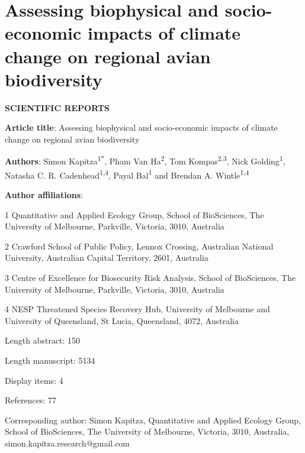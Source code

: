 \chapter{Assessing biophysical and socio-economic impacts of climate change on regional avian biodiversity}\label{ch2}
\newpage

{\parindent0pt
\textbf{SCIENTIFIC REPORTS}

\vspace{2cm}

\textbf{Article title}: Assessing biophysical and socio-economic impacts of climate change on regional avian biodiversity

\vspace{1cm}

\textbf{Authors}: Simon Kapitza\textsuperscript{1*}, Pham Van Ha\textsuperscript{2}, Tom Kompas\textsuperscript{2,3}, Nick Golding\textsuperscript{1}, Natasha C. R. Cadenhead\textsuperscript{1,4}, Payal Bal\textsuperscript{1} and Brendan A. Wintle\textsuperscript{1,4}

\vspace{1cm}

\textbf{Author affiliations}:

1 Quantitative and Applied Ecology Group, School of BioSciences, The University of Melbourne, Parkville, Victoria, 3010, Australia

2 Crawford School of Public Policy, Lennox Crossing, Australian National University, Australian Capital Territory, 2601, Australia

3 Centre of Excellence for Biosecurity Risk Analysis, School of BioSciences, The University of Melbourne, Parkville, Victoria, 3010, Australia

4 NESP Threatened Species Recovery Hub, University of Melbourne and University of Queensland, St Lucia, Queensland, 4072, Australia

\vspace{1cm}

Length abstract: 150

\vspace{1cm}

Length manuscript: 5134

\vspace{1cm}

Display items: 4

\vspace{1cm}

References: 77

\vspace{1cm}

Corresponding author: Simon Kapitza, Quantitative and Applied Ecology Group, School of BioSciences, The University of Melbourne, Victoria, 3010, Australia, simon.kapitza.research@gmail.com
}

